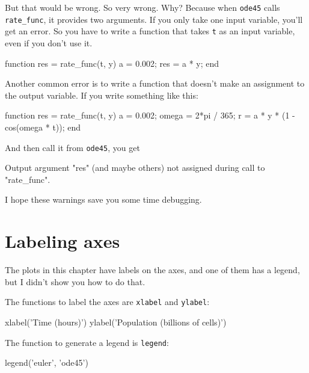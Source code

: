\documentclass[main.tex]{subfiles}
\begin{document}
But that would be wrong.  So very wrong.  Why?  Because
when {\tt ode45} calls {\tt rate\_func}, it provides two arguments.
If you only take one input variable, you'll get an error.  So
you have to write a function that takes {\tt t} as an input
variable, even if you don't use it.


\begin{code}
function res = rate_func(t, y)     %
    a = 0.002;
    res = a * y;
end
\end{code}

Another common error is to write a function that doesn't make
an assignment to the output variable.  If you write something
like this:

\begin{code}
function res = rate_func(t, y)
    a = 0.002;
    omega = 2*pi / 365;
    r = a * y * (1 - cos(omega * t));    %
end
\end{code}

And then call it from {\tt ode45}, you get

\begin{code}
Output argument "res" (and maybe others) not assigned during call
to "rate_func".
\end{code}

I hope these warnings save you some time debugging.


\section{Labeling axes}

The plots in this chapter have labels on the axes, and one of them has a legend, but I didn't show you how to do that.


The functions to label the axes are {\tt xlabel} and {\tt ylabel}:

\begin{code}
xlabel('Time (hours)')
ylabel('Population (billions of cells)')
\end{code}

The function to generate a legend is {\tt legend}:

\begin{code}
legend('euler', 'ode45')
\end{code}

\end{document}
